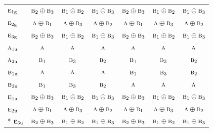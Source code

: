 \documentclass[10pt,a4paper]{article}
\numberwithin{equation}{section}
\newcommand{\irr}[1]{\text{\normalfont\scshape #1}}
\newcommand{\ptag}[1]{\mathrm{#1}}
\begin{document}
{\begin{longtable}{@{}lcccccc@{}}
$\irr{e}_{1\ptag{g}}$ & $\irr{b}_{2}\oplus \irr{b}_{3}$ & $\irr{b}_{1}\oplus \irr{b}_{2}$ & $\irr{b}_{1}\oplus \irr{b}_{3}$ & $\irr{b}_{2}\oplus \irr{b}_{3}$ & $\irr{b}_{1}\oplus \irr{b}_{2}$ & $\irr{b}_{1}\oplus \irr{b}_{3}$\\
$\irr{e}_{2\ptag{g}}$ & $\irr{a}\oplus \irr{b}_{1}$ & $\irr{a}\oplus \irr{b}_{3}$ & $\irr{a}\oplus \irr{b}_{2}$ & $\irr{a}\oplus \irr{b}_{1}$ & $\irr{a}\oplus \irr{b}_{3}$ & $\irr{a}\oplus \irr{b}_{2}$\\
$\irr{e}_{3\ptag{g}}$ & $\irr{b}_{2}\oplus \irr{b}_{3}$ & $\irr{b}_{1}\oplus \irr{b}_{2}$ & $\irr{b}_{1}\oplus \irr{b}_{3}$ & $\irr{b}_{2}\oplus \irr{b}_{3}$ & $\irr{b}_{1}\oplus \irr{b}_{2}$ & $\irr{b}_{1}\oplus \irr{b}_{3}$\\
$\irr{a}_{1\ptag{u}}$ & $\irr{a}$ & $\irr{a}$ & $\irr{a}$ & $\irr{a}$ & $\irr{a}$ & $\irr{a}$\\
$\irr{a}_{2\ptag{u}}$ & $\irr{b}_{1}$ & $\irr{b}_{3}$ & $\irr{b}_{2}$ & $\irr{b}_{1}$ & $\irr{b}_{3}$ & $\irr{b}_{2}$\\
$\irr{b}_{1\ptag{u}}$ & $\irr{a}$ & $\irr{a}$ & $\irr{a}$ & $\irr{b}_{1}$ & $\irr{b}_{3}$ & $\irr{b}_{2}$\\
$\irr{b}_{2\ptag{u}}$ & $\irr{b}_{1}$ & $\irr{b}_{3}$ & $\irr{b}_{2}$ & $\irr{a}$ & $\irr{a}$ & $\irr{a}$\\
$\irr{e}_{1\ptag{u}}$ & $\irr{b}_{2}\oplus \irr{b}_{3}$ & $\irr{b}_{1}\oplus \irr{b}_{2}$ & $\irr{b}_{1}\oplus \irr{b}_{3}$ & $\irr{b}_{2}\oplus \irr{b}_{3}$ & $\irr{b}_{1}\oplus \irr{b}_{2}$ & $\irr{b}_{1}\oplus \irr{b}_{3}$\\
$\irr{e}_{2\ptag{u}}$ & $\irr{a}\oplus \irr{b}_{1}$ & $\irr{a}\oplus \irr{b}_{3}$ & $\irr{a}\oplus \irr{b}_{2}$ & $\irr{a}\oplus \irr{b}_{1}$ & $\irr{a}\oplus \irr{b}_{3}$ & $\irr{a}\oplus \irr{b}_{2}$\\*
$\irr{e}_{3\ptag{u}}$ & $\irr{b}_{2}\oplus \irr{b}_{3}$ & $\irr{b}_{1}\oplus \irr{b}_{2}$ & $\irr{b}_{1}\oplus \irr{b}_{3}$ & $\irr{b}_{2}\oplus \irr{b}_{3}$ & $\irr{b}_{1}\oplus \irr{b}_{2}$ & $\irr{b}_{1}\oplus \irr{b}_{3}$\\
\bottomrule\end{longtable}}
\end{document}
